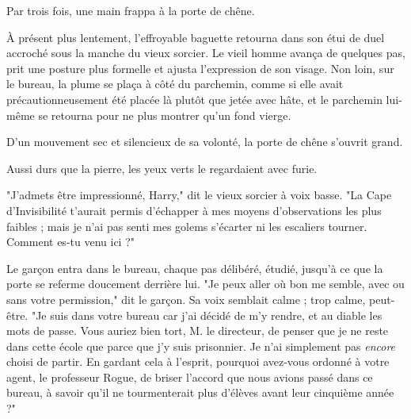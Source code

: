 Par trois fois, une main frappa à la porte de chêne.

À présent plus lentement, l'effroyable baguette retourna dans son étui de duel accroché sous la manche du vieux sorcier. Le vieil homme avança de quelques pas, prit une posture plus formelle et ajusta l'expression de son visage. Non loin, sur le bureau, la plume se plaça à côté du parchemin, comme si elle avait précautionneusement été placée là plutôt que jetée avec hâte, et le parchemin lui-même se retourna pour ne plus montrer qu'un fond vierge.

D'un mouvement sec et silencieux de sa volonté, la porte de chêne s'ouvrit grand.

Aussi durs que la pierre, les yeux verts le regardaient avec furie.

"J'admets être impressionné, Harry," dit le vieux sorcier à voix basse. "La Cape d'Invisibilité t'aurait permis d'échapper à mes moyens d'observations les plus faibles ; mais je n'ai pas senti mes golems s'écarter ni les escaliers tourner. Comment es-tu venu ici ?"

Le garçon entra dans le bureau, chaque pas délibéré, étudié, jusqu'à ce que la porte se referme doucement derrière lui. "Je peux aller où bon me semble, avec ou sans votre permission," dit le garçon. Sa voix semblait calme ; trop calme, peut-être. "Je suis dans votre bureau car j'ai décidé de m'y rendre, et au diable les mots de passe. Vous auriez bien tort, M. le directeur, de penser que je ne reste dans cette école que parce que j'y suis prisonnier. Je n'ai simplement pas \emph{encore}  choisi de partir. En gardant cela à l'esprit, pourquoi avez-vous ordonné à votre agent, le professeur Rogue, de briser l'accord que nous avions passé dans ce bureau, à savoir qu'il ne tourmenterait plus d'élèves avant leur cinquième année ?"


